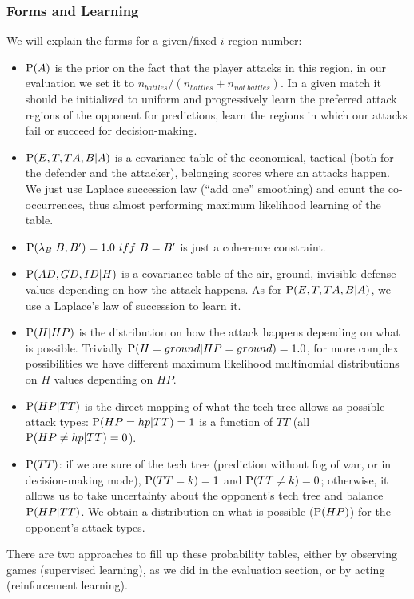 \subsubsection{Forms and Learning}
We will explain the forms for a given/fixed $i$ region number:
\begin{itemize}
\item $\mathrm{P}(A)$ is the prior on the fact that the player attacks in this region, in our evaluation we set it to $n_{battles}/(n_{battles}+n_{not\ battles})$. In a given match it should be initialized to uniform and progressively learn the preferred attack regions of the opponent for predictions, learn the regions in which our attacks fail or succeed for decision-making.
\item $\mathrm{P}(E,T,TA,B|A)$ is a covariance table of the economical, tactical (both for the defender and the attacker), belonging scores where an attacks happen. We just use Laplace succession law (``add one'' smoothing) \cite{Jaynes} and count the co-occurrences, thus almost performing maximum likelihood learning of the table.
\item $\PP(\lambda_{B}|B,B') = 1.0\ iff\ B=B'$ is just a coherence constraint.
\item $\mathrm{P}(AD,GD,ID|H)$ is a covariance table of the air, ground, invisible defense values depending on how the attack happens. As for $\mathrm{P}(E,T,TA,B|A)$, we use a Laplace's law of succession to learn it.
\item $\mathrm{P}(H|HP)$ is the distribution on how the attack happens depending on what is possible. Trivially $\mathrm{P}(H=ground|HP=ground)=1.0$, for more complex possibilities we have different maximum likelihood multinomial distributions on $H$ values depending on $HP$.
\item $\mathrm{P}(HP|TT)$ is the direct mapping of what the tech tree allows as possible attack types: $\mathrm{P}(HP=hp|TT)=1$ is a function of $TT$ (all $\mathrm{P}(HP\neq hp|TT)=0$).
\item $\mathrm{P}(TT)$: if we are sure of the tech tree (prediction without fog of war, or in decision-making mode), $\mathrm{P}(TT=k)=1$ and $\mathrm{P}(TT\neq k)=0$; otherwise, it allows us to take uncertainty about the opponent's tech tree and balance $\mathrm{P}(HP|TT)$. We obtain a distribution on what is possible ($\mathrm{P}(HP)$) for the opponent's attack types.
\end{itemize}
There are two approaches to fill up these probability tables, either by observing games (supervised learning), as we did in the evaluation section, or by acting (reinforcement learning). %
